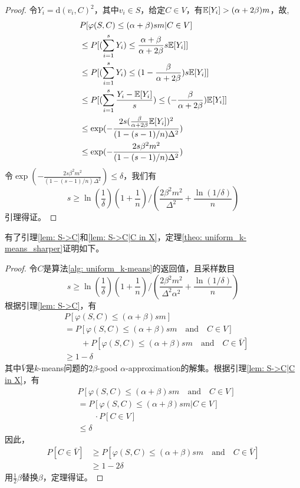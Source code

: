 \begin{proof}
    令$Y_i = \text{d}(v_i,C)^2$，其中$v_i \in S$，给定$C \in V$，有$\mathbb{E}[Y_i] > (\alpha+2\beta)m$，故,
    \begin{align}
    &P[\varphi(S,C) \leq (\alpha+\beta)sm | C \in V] \\
    &\leq P[(\sum_{i=1}^s Y_i) \leq \frac{\alpha+\beta}{\alpha+2\beta}s\mathbb{E}[Y_i]] \\
    &\leq P[(\sum_{i=1}^s Y_i) \leq (1-\frac{\beta}{\alpha+2\beta})s\mathbb{E}[Y_i]] \\
    &\leq P[(\sum_{i=1}^s \frac{Y_i - \mathbb{E}[Y_i]}{s}) \leq (-\frac{\beta}{\alpha+2\beta})\mathbb{E}[Y_i]] \\
    &\leq \exp(-\frac{2s(\frac{\beta}{\alpha+2\beta}\mathbb{E}[Y_i])^2}{(1-(s-1)/n)\Delta^2}) \\
    &\leq \exp(-\frac{2s\beta^2 m^2}{(1-(s-1)/n)\Delta^2})
    \end{align}
    令$\exp(-\frac{2s\beta^2 m^2}{(1-(s-1)/n)\Delta^2}) \leq \delta$，我们有
    \begin{equation}
    s \geq \ln(\frac{1}{\delta})(1+\frac{1}{n})/(\frac{2\beta^2 m^2}{\Delta^2}+\frac{\ln(1/\delta)}{n})
    \end{equation}
    引理得证。
\end{proof}
有了引理\ref{lem: S->C}和\ref{lem: S->C|C in X}，定理\ref{theo: uniform_k-means_sharper}证明如下。
\begin{proof}
    令$C$是算法\ref{alg: uniform_k-means}的返回值，且采样数目
    \begin{equation}
    s \geq \ln(\frac{1}{\delta})(1+\frac{1}{n})/(\frac{2\beta^2 m^2}{\Delta^2 \alpha^2}+\frac{\ln(1/\delta)}{n})
    \end{equation}
    根据引理\ref{lem: S->C}，有
    \begin{align}
        &P[\varphi(S,C) \leq (\alpha + \beta)sm] \\
        &= P[\varphi(S,C) \leq (\alpha + \beta)sm \quad \text{and} \quad C \in V] \\
        & \qquad {} + P[\varphi(S,C) \leq (\alpha + \beta)sm \quad \text{and} \quad C \in \bar{V}] \\
        &\geq 1-\delta
    \end{align}
    其中$\bar{V}$是$k$-means问题的$2\beta$-good $\alpha$-approximation的解集。根据引理\ref{lem: S->C|C in X}，有
    \begin{align}
    &P[\varphi(S,C) \leq (\alpha + \beta)sm \quad \text{and} \quad C \in V] \\
    &= P[\varphi(S,C) \leq (\alpha+\beta)sm | C \in V] \\
    &\qquad {} \cdot P[C \in V] \\
    &\leq \delta
    \end{align}
    因此，
    \begin{align}
    P[C \in \bar{V}] 
    &\geq P[\varphi(S,C) \leq (\alpha + \beta)sm \quad \text{and} \quad C \in \bar{V}] \\
    &\geq 1-2\delta
    \end{align}
    用$\frac{1}{2}\beta$替换$\beta$，定理得证。
\end{proof}

